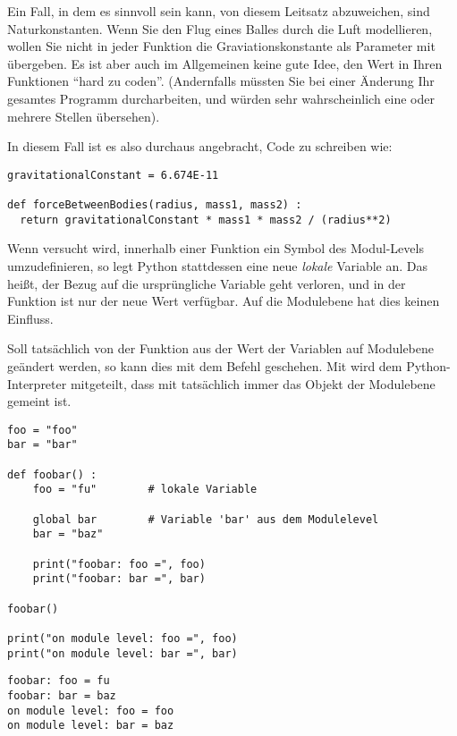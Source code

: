 \begin{hintbox}[Konstanten]
Ein Fall, in dem es sinnvoll sein kann, von diesem Leitsatz abzuweichen, sind Naturkonstanten. Wenn Sie den Flug eines Balles durch die Luft modellieren, wollen Sie nicht in jeder Funktion die Graviationskonstante als Parameter mit übergeben. Es ist aber auch im Allgemeinen keine gute Idee, den Wert in Ihren Funktionen \enquote{hard zu coden}. (Andernfalls müssten Sie bei einer Änderung Ihr gesamtes Programm durcharbeiten, und würden sehr wahrscheinlich eine oder mehrere Stellen übersehen).
\end{hintbox}
\begin{hintbox}[]
In diesem Fall ist es also durchaus angebracht, Code zu schreiben wie:
\begin{codebox}
\begin{verbatim}
gravitationalConstant = 6.674E-11

def forceBetweenBodies(radius, mass1, mass2) :
  return gravitationalConstant * mass1 * mass2 / (radius**2)
\end{verbatim}
\end{codebox}
\end{hintbox}

Wenn versucht wird, innerhalb einer Funktion ein Symbol des Modul-Levels umzudefinieren, so legt Python stattdessen eine neue \emph{lokale} Variable an. Das heißt, der Bezug auf die ursprüngliche Variable geht verloren, und in der Funktion ist nur der neue Wert verfügbar. Auf die Modulebene hat dies keinen Einfluss.

Soll tatsächlich von der Funktion aus der Wert der Variablen auf Modulebene geändert werden, so kann dies mit dem Befehl  geschehen. Mit  wird dem Python-Interpreter mitgeteilt, dass mit  tatsächlich immer das Objekt der Modulebene gemeint ist.

\begin{codebox}
\begin{verbatim}
foo = "foo"
bar = "bar"

def foobar() :
    foo = "fu"        # lokale Variable
  
    global bar        # Variable 'bar' aus dem Modulelevel
    bar = "baz"

    print("foobar: foo =", foo)
    print("foobar: bar =", bar)

foobar()

print("on module level: foo =", foo)
print("on module level: bar =", bar)
\end{verbatim}
\end{codebox}
\begin{cmdbox}
\begin{verbatim}
foobar: foo = fu
foobar: bar = baz
on module level: foo = foo
on module level: bar = baz
\end{verbatim}
\end{cmdbox}

